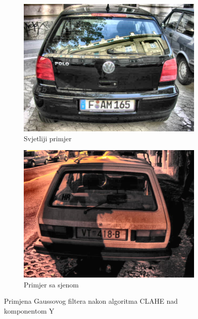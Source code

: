\documentclass[times, utf8, diplomski]{fer}
\begin{document}
\begin{figure}[H]
     \begin{subfigure}[b]{0.4\textwidth}
         \centering
         \includegraphics[width=\textwidth]{figures/ce_examples/3/gauss.jpg}
         \caption{Svjetliji primjer}
     \end{subfigure}
     \hspace{1cm}
     \begin{subfigure}[b]{0.4\textwidth}
         \centering
         \includegraphics[width=\textwidth]{figures/ce_examples/4/gauss.jpg}
         \caption{Primjer sa sjenom}
     \end{subfigure}
        \caption{Primjena Gaussovog filtera nakon algoritma CLAHE nad komponentom Y}
        \label{fig:ce_gauss}
\end{figure}
\end{document}

